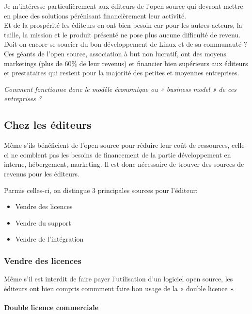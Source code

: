 			Je m'intéresse particulièrement aux éditeurs de l'open source qui devront mettre en place des solutions pérénisant financièrement leur activité.\\

			Et de la prospérité les éditeurs en ont bien besoin car pour les autres acteurs, la taille, la mission et le produit présenté ne pose plus aucune difficulté de revenu. Doit-on encore se soucier du bon développement de Linux et de sa communauté ? Ces géants de l'open source, association à but non lucratif, ont des moyens marketings (plus de 60\% de leur revenus) et financier bien supérieurs aux éditeurs et prestataires qui restent pour la majorité des petites et moyennes entreprises.

			\emph{Comment fonctionne donc le modèle économique ou « business model » de ces entreprises ?}\\

		\subsection{Chez les éditeurs}

			Même s'ils bénéficient de l'open source pour réduire leur coût de ressources, celle-ci ne comblent pas les besoins de financement de la partie développement en interne, hébergement, marketing. Il est donc nécessaire de trouver des sources de revenus pour les éditeurs.

			Parmis celles-ci, on distingue 3 principales sources pour l'éditeur:

			\begin{itemize}[label=\textbullet, font=\LARGE \color{burntorange}]
				\item Vendre des licences
				\item Vendre du support
				\item Vendre de l'intégration
			\end{itemize}

			\subsubsection{Vendre des licences}

				Même s'il est interdit de faire payer l'utilisation d'un logiciel open source, les éditeurs ont bien compris commment faire bon usage de la « double licence ».

				\paragraph{Double licence commerciale\\}

